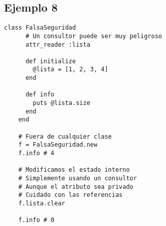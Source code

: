 \documentclass[a4paper,12pt]{article}
\begin{document}
\subsection{Ejemplo 8}
\begin{lstlisting}[style=customruby]
    class FalsaSeguridad
      # Un consultor puede ser muy peligroso
      attr_reader :lista
    
      def initialize
        @lista = [1, 2, 3, 4]
      end
    
      def info
        puts @lista.size
      end
    end
    
    # Fuera de cualquier clase
    f = FalsaSeguridad.new
    f.info # 4
    
    # Modificamos el estado interno
    # Simplemente usando un consultor
    # Aunque el atributo sea privado
    # Cuidado con las referencias
    f.lista.clear
    
    f.info # 0
\end{lstlisting}
\end{document}
